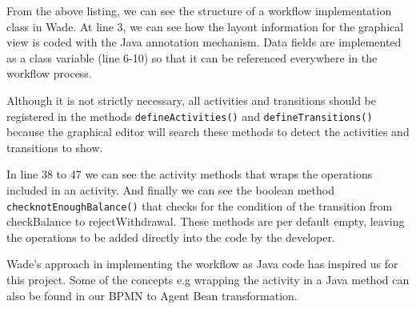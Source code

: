 From the above listing, we can see the structure of a workflow implementation class in Wade. At line 3, we can see how the layout information for the graphical view is coded with the Java annotation mechanism. Data fields are implemented as a class variable (line 6-10) so that it can be referenced everywhere in the workflow process. 

Although it is not strictly necessary, all activities and transitions should be registered in the methods \verb|defineActivities()| and \verb|defineTransitions()| because the graphical editor will search these methods to detect the activities and transitions to show.

In line 38 to 47 we can see the activity methods that wraps the operations included in an activity. And finally we can see the boolean method  \verb|checknotEnoughBalance()| that checks for the condition of the transition from checkBalance to rejectWithdrawal. These methods are per default empty, leaving the operations to be added directly into the code by the developer.

Wade's approach in implementing the workflow as Java code has inspired us for this project. Some of the concepts e.g wrapping the activity in a Java method can also be found in our BPMN to Agent Bean transformation. 